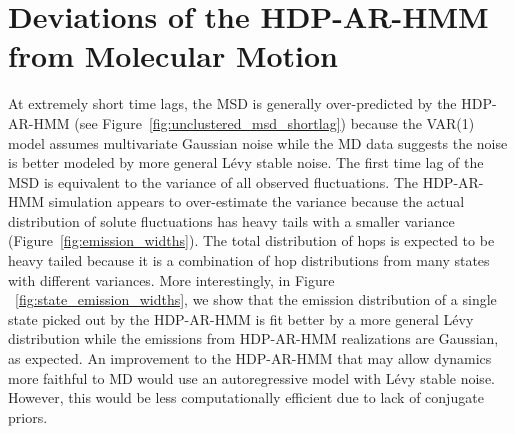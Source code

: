 \documentclass{article}
\begin{document}
  \section{Deviations of the HDP-AR-HMM from Molecular Motion}\label{section:shorttimes_msd}
  
  At extremely short time lags, the MSD is generally over-predicted by the HDP-AR-HMM
  (see Figure~\ref{fig:unclustered_msd_shortlag}) because the VAR(1) model assumes
  multivariate Gaussian noise while the MD data suggests the noise is better 
  modeled by more general L\'evy stable noise. The first time lag of the MSD is
  equivalent to the variance of all observed fluctuations. 
  The HDP-AR-HMM simulation appears to over-estimate the variance because the actual 
  distribution of solute fluctuations has heavy tails with a smaller variance (Figure~\ref{fig:emission_widths}).
  The total distribution of hops is expected to be heavy tailed because it is a
  combination of hop distributions from many states with different variances. More
  interestingly, in Figure ~\ref{fig:state_emission_widths}, we show that the 
  emission distribution of a single state picked out by the HDP-AR-HMM is fit better by
  a more general L\'evy distribution while the emissions from HDP-AR-HMM realizations are
  Gaussian, as expected. An improvement to the HDP-AR-HMM that may allow dynamics more 
  faithful to MD would use an autoregressive model with L\'evy stable noise. However,
  this would be less computationally efficient due to lack of conjugate priors.
  
\end{document}
